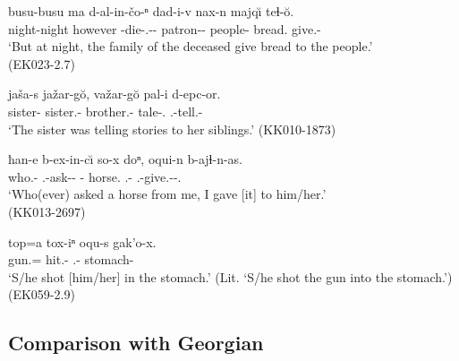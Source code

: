 \begin{exe}
	\ex\label{verbderiv-ex06}
	\begin{xlist}
		
		
			\ex\label{verbderiv-ex06a}
			\gll busu-busu ma d-al-in-čo-ⁿ dad-i-v nax-n majq\u{\i} teɬ-\u{o}.  \\
			night-night however {\D}-die-{\Ptcp}.{\Pst}-{\Obl}-{\Gen} patron-{\Pl}-\textbf{{\Erg}} people-\textbf{{\Dat}} bread.\textbf{{\Nom}} give.{\Ipfv}-{\Npst}\\
			\trans `But at night, the family of the deceased give bread to the people.' \\
			\hfill (EK023-2.7)
		
		
		
			\ex\label{verbderiv-ex06b}
			\gll jaša-s jažar-g\u{o}, važar-g\u{o} pal-i d-epc-or. \\
			sister-\textbf{{\Erg}} sister.{\Pl}-\textbf{{\All}} brother.{\Pl}-\textbf{{\All}} tale-{\Pl}.\textbf{{\Nom}} {\B}.{\Pl}-tell.{\Ipfv}-{\Imprf} \\
			\trans `The sister was telling stories to her siblings.'
			\hfill (KK010-1873)
		
		
		
			\ex\label{verbderiv-ex06c}
			\gll ħan-e b-ex-in-c\u{\i} so-x doⁿ, oqui-n b-ajɬ-n-as. \\
			who.\textbf{{\Erg}}-{\Rel} {\B}.{\Sg}-ask-{\Aor}-{\Subord} {\Fsg}-\textbf{{\Cont}} horse.\textbf{{\Nom}} {\Dist}.{\Obl}-{\Dat} {\B}.{\Sg}-give.{\Pfv}-{\Aor}-{\Fsg}.{\Erg} \\
			\trans `Who(ever) asked a horse from me, I gave [it] to him/her.' \\
			\hfill (KK013-2697)
		
		
		
			\ex\label{verbderiv-ex06d}
			\gll top=a tox-iⁿ oqu-s gak'o-x.  \\
			gun.\textbf{{\Nom}}={\Emph} hit.{\Pfv}-{\Aor} {\Dist}.{\Obl}-\textbf{{\Erg}} stomach-\textbf{{\Cont}} \\
			\trans `S/he shot [him/her] in the stomach.' (Lit. `S/he shot the gun into the stomach.')
			\hfill (EK059-2.9)
		
		
	\end{xlist}
\end{exe}


\subsection{Comparison with Georgian} \label{intr-erg-geo}

